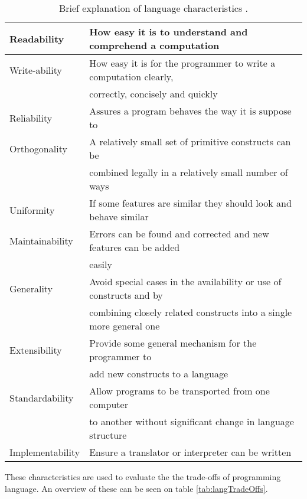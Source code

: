 \begin{table}[H]
	\begin{tabular}{|l|l|}
		\hline
		Readability & How easy it is to understand and comprehend a computation \\ \hline
		Write-ability & How easy it is for the programmer to write a computation clearly, \\
		~ & correctly, concisely and quickly \\ \hline
		Reliability & Assures a program behaves the way it is suppose to \\ \hline
		Orthogonality & A relatively small set of primitive constructs can be \\
		~ & combined legally in a relatively small number of ways \\ \hline		
		Uniformity & If some features are similar they should look and behave similar \\ \hline
		Maintainability & Errors can be found and corrected and new features can be added \\
		~ & easily \\ \hline
		Generality & Avoid special cases in the availability or use of constructs and by \\ 
		~ & combining closely related constructs into a single more general one \\ \hline
		Extensibility & Provide some general mechanism for the programmer to \\
		~ & add new constructs to a language \\ \hline
		Standardability & Allow programs to be transported from one computer \\
		~ & to another without significant change in language structure \\ \hline
		Implementability & Ensure a translator or interpreter can be written \\
		\hline
	\end{tabular}
	\caption{Brief explanation of language characteristics \citep{sebesta}.}
	\label{tab:langCharacteristics}
\end{table}

These characteristics are used to evaluate the the trade-offs of programming language. An overview of these can be seen on table \ref{tab:langTradeOffs}.

